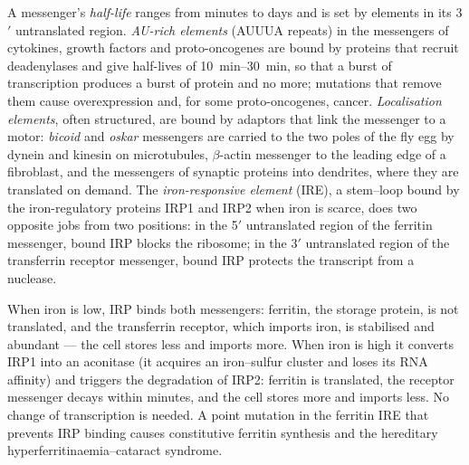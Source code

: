 \begin{definition}\label{def:b3:rna-regulation:stability}
A messenger's \emph{half-life} ranges from minutes to days and is set by
elements in its 3$'$ untranslated region. \emph{AU-rich elements}
(AUUUA repeats) in the messengers of cytokines, growth factors and
proto-oncogenes are bound by proteins that recruit deadenylases and
give half-lives of \qtyrange{10}{30}{min}, so that a burst of
transcription produces a burst of protein and no more; mutations that
remove them cause overexpression and, for some proto-oncogenes, cancer.
\emph{Localisation elements}, often structured, are bound by adaptors
that link the messenger to a motor: \emph{bicoid} and \emph{oskar}
messengers are carried to the two poles of the fly egg by dynein and
kinesin on microtubules, $\beta$-actin messenger to the leading edge of
a fibroblast, and the messengers of synaptic proteins into dendrites,
where they are translated on demand. The \emph{iron-responsive element}
(IRE), a stem--loop bound by the iron-regulatory proteins IRP1 and
IRP2 when iron is scarce, does two opposite jobs from two positions: in
the 5$'$ untranslated region of the ferritin messenger, bound IRP
blocks the ribosome; in the 3$'$ untranslated region of the transferrin
receptor messenger, bound IRP protects the transcript from a nuclease.
\end{definition}

\begin{example}\label{ex:b3:rna-regulation:iron}
When iron is low, IRP binds both messengers: ferritin, the storage
protein, is not translated, and the transferrin receptor, which imports
iron, is stabilised and abundant --- the cell stores less and imports
more. When iron is high it converts IRP1 into an aconitase (it acquires
an iron--sulfur cluster and loses its RNA affinity) and triggers the
degradation of IRP2: ferritin is translated, the receptor messenger
decays within minutes, and the cell stores more and imports less. No
change of transcription is needed. A point mutation in the ferritin
IRE that prevents IRP binding causes constitutive ferritin synthesis
and the hereditary hyperferritinaemia--cataract syndrome.
\end{example}

